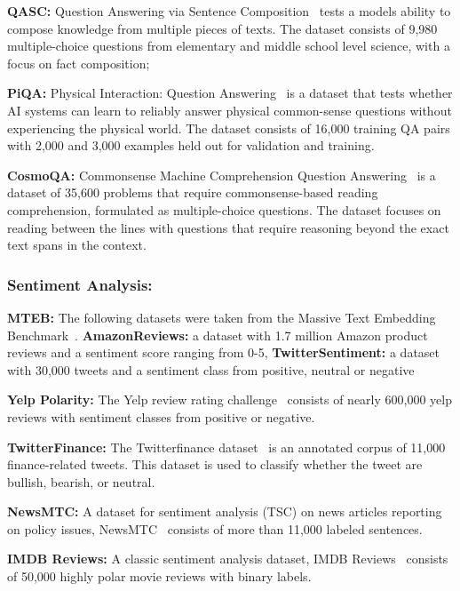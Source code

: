 \noindent\textbf{QASC:} Question Answering via Sentence Composition~\citep{allenai:qasc} tests a models ability to compose knowledge from multiple pieces of texts. The dataset consists of 9,980 multiple-choice questions from elementary and middle school level science, with a focus on fact composition;


\noindent\textbf{PiQA:} Physical Interaction: Question Answering~\citep{Bisk2020} is a dataset that tests whether AI systems can learn to reliably answer physical common-sense questions without experiencing the physical world. The dataset consists of 16,000 training QA pairs with 2,000 and 3,000 examples held out for validation and training. 

\noindent\textbf{CosmoQA:} Commonsense Machine Comprehension Question Answering~\citep{huang-etal-2019-cosmos} is a dataset of 35,600 problems that require commonsense-based reading comprehension, formulated as multiple-choice questions. The dataset focuses on reading between the lines with questions that require reasoning beyond the exact text spans in the context.

\subsubsection{Sentiment Analysis:}

\noindent\textbf{MTEB:} The following datasets were taken from the Massive Text Embedding Benchmark~\citep{muennighoff2022mteb}. \textbf{AmazonReviews:} a dataset with 1.7 million Amazon product reviews and a sentiment score ranging from 0-5, \textbf{TwitterSentiment:} a dataset with 30,000 tweets and a sentiment class from positive, neutral or negative 

\noindent\textbf{Yelp Polarity:} The Yelp review rating challenge~\citep{asghar2016yelp} consists of nearly 600,000 yelp reviews with sentiment classes from positive or negative.

\noindent\textbf{TwitterFinance:} The Twitterfinance dataset~\citep{ATwitter} is an annotated corpus of 11,000 finance-related tweets. This dataset is used to classify whether the tweet are bullish, bearish, or neutral.

\noindent\textbf{NewsMTC:} A dataset for sentiment analysis (TSC) on news articles reporting on policy issues, NewsMTC~\citep{Hamborg2021b} consists of more than 11,000 labeled sentences.

\noindent\textbf{IMDB Reviews:} A classic sentiment analysis dataset, IMDB Reviews~\citep{maas-EtAl:2011:ACL-HLT2011} consists of 50,000 highly polar movie reviews with binary labels.

